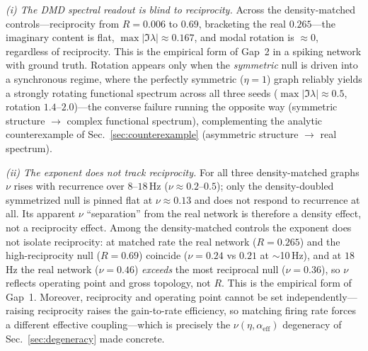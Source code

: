 \documentclass[11pt]{article}
\newcommand{\alphaeff}{\alpha_{\mathrm{eff}}}
\begin{document}
\emph{(i) The DMD spectral readout is blind to reciprocity.} Across the
density-matched controls---reciprocity from $R=0.006$ to $0.69$, bracketing the
real $0.265$---the imaginary content is flat, $\max|\Im\lambda|\approx0.167$, and
modal rotation is $\approx0$, regardless of reciprocity. This is the empirical
form of Gap~2 in a spiking network with ground truth. Rotation appears only when
the \emph{symmetric} null is driven into a synchronous regime, where the
perfectly symmetric ($\eta=1$) graph reliably yields a strongly rotating
functional spectrum across all three seeds ($\max|\Im\lambda|\approx0.5$,
rotation $1.4$--$2.0$)---the converse failure
running the opposite way (symmetric structure $\to$ complex functional spectrum),
complementing the analytic counterexample of Sec.~\ref{sec:counterexample}
(asymmetric structure $\to$ real spectrum).

\emph{(ii) The exponent does not track reciprocity.} For all three
density-matched graphs $\nu$ rises with recurrence over $8$--$18$\,Hz
($\nu\approx0.2$--$0.5$); only the density-doubled symmetrized null is pinned
flat at $\nu\approx0.13$ and does not respond to recurrence at all. Its apparent
$\nu$ ``separation'' from the real network is therefore a density effect, not a
reciprocity effect. Among the density-matched controls the exponent does not
isolate reciprocity: at matched rate the real network ($R=0.265$) and the
high-reciprocity null ($R=0.69$) coincide ($\nu=0.24$ vs $0.21$ at
$\sim$10\,Hz), and at $18$\,Hz the real network ($\nu=0.46$) \emph{exceeds} the
most reciprocal null ($\nu=0.36$), so $\nu$ reflects operating point and gross
topology, not $R$. This is the empirical form of Gap~1. Moreover, reciprocity
and operating point cannot be set independently---raising reciprocity raises the
gain-to-rate efficiency, so matching firing rate forces a different effective
coupling---which is precisely the $\nu(\eta,\alphaeff)$ degeneracy of
Sec.~\ref{sec:degeneracy} made concrete.
\end{document}
